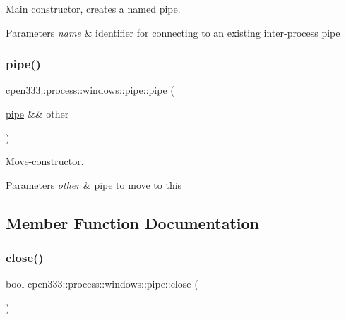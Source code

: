 Main constructor, creates a named pipe. 


\begin{DoxyParams}{Parameters}
{\em name} & identifier for connecting to an existing inter-\/process pipe \\
\hline
\end{DoxyParams}
\mbox{\label{classcpen333_1_1process_1_1windows_1_1pipe_a4697295dcf61f8f1deb875adfb2ea303}} 
\subsubsection{\texorpdfstring{pipe()}{pipe()}\hspace{0.1cm}{\footnotesize\ttfamily [2/2]}}
{\footnotesize\ttfamily cpen333\+::process\+::windows\+::pipe\+::pipe (\begin{DoxyParamCaption}\item[{\hyperlink{classcpen333_1_1process_1_1windows_1_1pipe}{pipe} \&\&}]{other }\end{DoxyParamCaption})\hspace{0.3cm}{\ttfamily [inline]}}



Move-\/constructor. 


\begin{DoxyParams}{Parameters}
{\em other} & pipe to move to this \\
\hline
\end{DoxyParams}


\subsection{Member Function Documentation}
\mbox{\label{classcpen333_1_1process_1_1windows_1_1pipe_a6d01b3a84c6184ba02e9825003386d20}} 
\subsubsection{\texorpdfstring{close()}{close()}}
{\footnotesize\ttfamily bool cpen333\+::process\+::windows\+::pipe\+::close (\begin{DoxyParamCaption}{ }\end{DoxyParamCaption})\hspace{0.3cm}{\ttfamily [inline]}}



